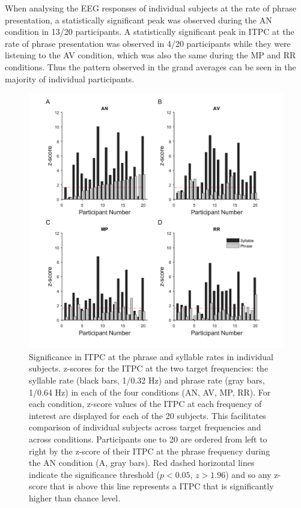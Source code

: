 \documentclass[10pt,letterpaper]{article}
\begin{document}
When analysing the EEG responses of individual subjects at the rate of phrase presentation, a statistically significant peak was observed during the AN condition in 13/20 participants. A statistically significant peak in ITPC at the rate of phrase presentation was observed in 4/20 participants while they were listening to the AV condition, which was also the same during the MP and RR conditions. Thus the pattern observed in the grand averages can be seen in the majority of individual participants. 

\begin{figure}[tbhp]
\includegraphics[width=\linewidth]{Exp2_individual_results_bar_graphs_thick.png}
\caption{Significance in ITPC at the phrase and syllable rates in individual subjects. z-scores for the ITPC at the two target frequencies: the syllable rate (black bars, 1/0.32 Hz) and phrase rate (gray bars, 1/0.64 Hz) in each of the four conditions (AN, AV, MP, RR). For each condition, z-score values of the ITPC at each frequency of interest are displayed for each of the 20 subjects. This facilitates comparison of individual subjects across target frequencies and across conditions. Participants one to 20 are ordered from left to right by the z-score of their ITPC at the phrase frequency during the AN condition (A, gray bars). Red dashed horizontal lines indicate the significance threshold ($p<0.05$, $z>1.96$) and so any z-score that is above this line represents a  ITPC that is significantly higher than chance level.}
\label{fig:Fig3}
\end{figure}
\end{document}

